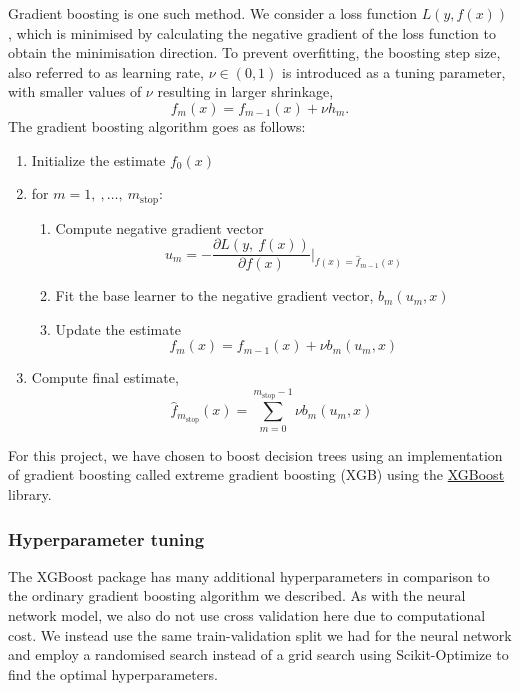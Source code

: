 \documentclass[a4paper, 11pt, twocolumn]{article}
\begin{document}
Gradient boosting is one such method. We consider a loss function $L(y, f(x))$,
which is minimised by calculating the negative gradient of the loss
function to obtain the minimisation direction. To prevent overfitting, the
boosting step size, also referred to as learning rate, $\nu \in (0,1)$ is 
introduced as a tuning parameter, with smaller values of $\nu$ resulting in 
larger shrinkage,  
\begin{equation}
f_m(x)=f_{m-1}(x) + \nu h_m .
\end{equation}
The gradient boosting algorithm goes as follows: \cite{RiccardoGB}
\begin{enumerate}[leftmargin=5mm, itemsep=0pt,  parsep=1pt]
\item Initialize the estimate $f_0(x)$
\item for $m= 1,\ ,\dots,\ m_\text{stop}$:
      \begin{enumerate}[leftmargin=5mm, itemsep=0pt,  parsep=1pt]
            \item Compute negative gradient vector
            \begin{equation*}
                  u_m = -\frac{\partial L(y,\ f(x))}{\partial f(x)} \bigg\vert
                  _{f(x)=\hat{f}_{m-1}(x)}
            \end{equation*}
            \item Fit the base learner to the negative gradient vector,
            $b_m(u_m, x)$
            \item Update the estimate
            \begin{equation*}
                  f_m(x) = f_{m-1}(x) + \nu b_m (u_m, x)
            \end{equation*}
      \end{enumerate}
\item Compute final estimate,
      \begin{equation*}
            \hat{f}_{m_\text{stop}} (x) =
            \sum _{m=0}^{m_\text{stop}-1}\nu b_m(u_m, x)
      \end{equation*}
\end{enumerate}

For this project, we have chosen to boost decision trees using an implementation 
of gradient boosting called extreme gradient boosting (XGB) using the 
\href{https://github.com/dmlc/xgboost}{XGBoost} library.

\subsubsection{Hyperparameter tuning}
The XGBoost package has many additional hyperparameters in comparison to the 
ordinary gradient boosting algorithm we described. 
As with the neural network model, we also do not use cross validation here due 
to computational cost. We instead use the same train-validation split we had for 
the neural network and employ a randomised search instead of a grid search using 
Scikit-Optimize to find the optimal hyperparameters. 
\end{document}

